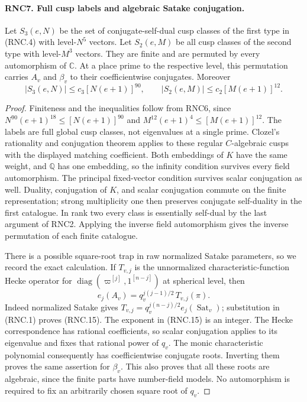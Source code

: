 \documentclass[11pt,a4paper]{article}
\numberwithin{equation}{section}
\theoremstyle{remark}\newtheorem{remark}[theorem]{Remark}
\begin{document}
\paragraph{RNC7. Full cusp labels and algebraic Satake conjugation.}
\label{claim:RNC7}
Let $S_3(e,N)$ be the set of conjugate-self-dual cusp classes
of the first type in (RNC.4) with level-$N^5$ vectors.
Let $S_2(e,M)$ be all cusp classes of the second type with
level-$M^3$ vectors.  They are finite and are permuted by
every automorphism of $\mathbb C$.  At a place prime to the
respective level, this permutation carries $A_v$ and
$\beta_v$ to their coefficientwise conjugates.  Moreover
\[
 |S_3(e,N)|\leq c_3[N(e+1)]^{90},\qquad
 |S_2(e,M)|\leq c_2[M(e+1)]^{12}.                              \tag{RNC.14}
\]
\begin{proof}
Finiteness and the inequalities follow from RNC6, since
$N^{90}(e+1)^{18}\leq[N(e+1)]^{90}$ and
$M^{12}(e+1)^4\leq[M(e+1)]^{12}$.
The labels are full global cusp classes, not eigenvalues
at a single prime.  Clozel's rationality and conjugation
theorem applies to these regular $C$-algebraic cusps with
the displayed matching coefficient.  Both embeddings of
$K$ have the same weight, and $\mathbb Q$ has one embedding,
so the infinity condition survives every field automorphism.
The principal fixed-vector condition survives scalar
conjugation as well.  Duality, conjugation of $K$, and
scalar conjugation commute on the finite representation;
strong multiplicity one then preserves conjugate
self-duality in the first catalogue.  In rank two every
class is essentially self-dual by the last argument of
RNC2.  Applying the inverse field automorphism gives the
inverse permutation of each finite catalogue.

There is a possible square-root trap in raw normalized
Satake parameters, so we record the exact calculation.
If $T_{v,j}$ is the unnormalized characteristic-function
Hecke operator for
$\operatorname{diag}(\varpi^{[j]},1^{[n-j]})$ at spherical
level, then
\[
       e_j(A_v)=q_v^{j(j-1)/2}\,T_{v,j}(\pi).                 \tag{RNC.15}
\]
Indeed normalized Satake gives
$T_{v,j}=q_v^{j(n-j)/2}e_j(\operatorname{Sat}_v)$;
substitution in (RNC.1) proves (RNC.15).  The exponent in
(RNC.15) is an integer.  The Hecke correspondence has
rational coefficients, so scalar conjugation applies to
its eigenvalue and fixes that rational power of $q_v$.
The monic characteristic polynomial consequently has
coefficientwise conjugate roots.  Inverting them proves
the same assertion for $\beta_v$.  This also proves that
all these roots are algebraic, since the finite parts have
number-field models.  No automorphism is required to fix
an arbitrarily chosen square root of $q_v$.
\end{proof}
\end{document}
